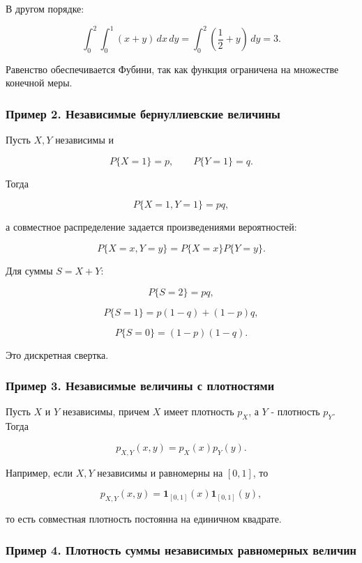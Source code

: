 \documentclass[
  11pt,
  a4paper,
]{article}
\begin{document}
В другом порядке:

\[
\int_0^2\int_0^1(x+y)\,dx\,dy
=
\int_0^2\left(\frac12+y\right)\,dy
=
3.
\]

Равенство обеспечивается Фубини, так как функция ограничена на множестве
конечной меры.

\subsubsection{Пример 2. Независимые бернуллиевские
величины}\label{ux43fux440ux438ux43cux435ux440-2.-ux43dux435ux437ux430ux432ux438ux441ux438ux43cux44bux435-ux431ux435ux440ux43dux443ux43bux43bux438ux435ux432ux441ux43aux438ux435-ux432ux435ux43bux438ux447ux438ux43dux44b}

Пусть \(X,Y\) независимы и

\[
P\{X=1\}=p,\qquad P\{Y=1\}=q.
\]

Тогда

\[
P\{X=1,Y=1\}=pq,
\]

а совместное распределение задается произведениями вероятностей:

\[
P\{X=x,Y=y\}=P\{X=x\}P\{Y=y\}.
\]

Для суммы \(S=X+Y\):

\[
P\{S=2\}=pq,
\]

\[
P\{S=1\}=p(1-q)+(1-p)q,
\]

\[
P\{S=0\}=(1-p)(1-q).
\]

Это дискретная свертка.

\subsubsection{Пример 3. Независимые величины с
плотностями}\label{ux43fux440ux438ux43cux435ux440-3.-ux43dux435ux437ux430ux432ux438ux441ux438ux43cux44bux435-ux432ux435ux43bux438ux447ux438ux43dux44b-ux441-ux43fux43bux43eux442ux43dux43eux441ux442ux44fux43cux438}

Пусть \(X\) и \(Y\) независимы, причем \(X\) имеет плотность \(p_X\), а
\(Y\) - плотность \(p_Y\). Тогда

\[
p_{X,Y}(x,y)=p_X(x)p_Y(y).
\]

Например, если \(X,Y\) независимы и равномерны на \([0,1]\), то

\[
p_{X,Y}(x,y)=\mathbf 1_{[0,1]}(x)\mathbf 1_{[0,1]}(y),
\]

то есть совместная плотность постоянна на единичном квадрате.

\subsubsection{Пример 4. Плотность суммы независимых равномерных
величин}\label{ux43fux440ux438ux43cux435ux440-4.-ux43fux43bux43eux442ux43dux43eux441ux442ux44c-ux441ux443ux43cux43cux44b-ux43dux435ux437ux430ux432ux438ux441ux438ux43cux44bux445-ux440ux430ux432ux43dux43eux43cux435ux440ux43dux44bux445-ux432ux435ux43bux438ux447ux438ux43d}
\end{document}
